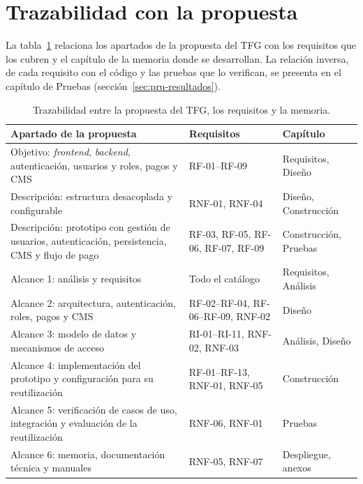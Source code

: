 \section{Trazabilidad con la propuesta}
\label{sec:req-trazabilidad}

La tabla~\ref{tab:req-traza-propuesta} relaciona los apartados de la
propuesta del TFG con los requisitos que los cubren y el capítulo de la
memoria donde se desarrollan. La relación inversa, de cada requisito con el
código y las pruebas que lo verifican, se presenta en el capítulo de Pruebas
(sección~\ref{sec:pru-resultados}).

\begin{table}[htbp]
  \centering
  \footnotesize
  \caption{Trazabilidad entre la propuesta del TFG, los requisitos y la memoria.}
  \label{tab:req-traza-propuesta}
  \begin{tabularx}{\textwidth}{@{}>{\raggedright\arraybackslash}X>{\raggedright\arraybackslash}p{3.6cm}>{\raggedright\arraybackslash}p{3.2cm}@{}}
    \toprule
    \textbf{Apartado de la propuesta} & \textbf{Requisitos} & \textbf{Capítulo} \\
    \midrule
    Objetivo: \textit{frontend}, \textit{backend}, autenticación, usuarios y roles, pagos y CMS & RF-01--RF-09 & Requisitos, Diseño \\
    Descripción: estructura desacoplada y configurable & RNF-01, RNF-04 & Diseño, Construcción \\
    Descripción: prototipo con gestión de usuarios, autenticación, persistencia, CMS y flujo de pago & RF-03, RF-05, RF-06, RF-07, RF-09 & Construcción, Pruebas \\
    Alcance 1: análisis y requisitos & Todo el catálogo & Requisitos, Análisis \\
    Alcance 2: arquitectura, autenticación, roles, pagos y CMS & RF-02--RF-04, RF-06--RF-09, RNF-02 & Diseño \\
    Alcance 3: modelo de datos y mecanismos de acceso & RI-01--RI-11, RNF-02, RNF-03 & Análisis, Diseño \\
    Alcance 4: implementación del prototipo y configuración para su reutilización & RF-01--RF-13, RNF-01, RNF-05 & Construcción \\
    Alcance 5: verificación de casos de uso, integración y evaluación de la reutilización & RNF-06, RNF-01 & Pruebas \\
    Alcance 6: memoria, documentación técnica y manuales & RNF-05, RNF-07 & Despliegue, anexos \\
    \bottomrule
  \end{tabularx}
\end{table}


